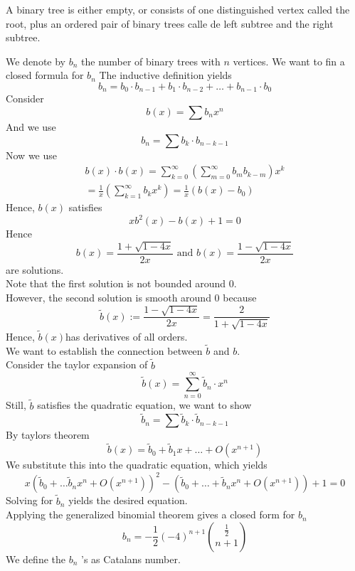 \documentclass[../main.tex]{subfiles}
\begin{document}
\begin{defn}
	A binary tree is either empty, or consists of one distinguished vertex called the root, plus an ordered pair of binary trees calle de left subtree and the right subtree.
\end{defn}
We denote by $b_n$ the number of binary trees with $n$ vertices. We want to fin a closed formula for $b_n$
The inductive definition yields
\[ 
b_n = b_0 \cdot b_{n-1}  + b_1 \cdot b_{n-2}  + \ldots + b_{n-1}  \cdot b_0
\]
Consider
\[ 
	b( x)  = \sum b_n x^{n}
\]
And we use
\[ 
 b_n = \sum b_k \cdot b_{n-k-1} 
\]
Now we use
\begin{align*}
b( x) \cdot b( x)  = \sum_{k=0}^{ \infty } \left( \sum_{m=0}^{ \infty }b_m b_{k-m}  \right) x^{k}\\
= \frac{1}{x} \left( \sum_{k=1}^{ \infty } b_k x^{k}\right)  = \frac{1}{x}(  b( x) -b_0) 
\end{align*}
Hence, $b( x) $ satisfies
\[ 
	x b^{2}( x) -b( x) +1=0
\]
Hence
\[ 
	b( x)  = \frac{1+ \sqrt{1-4x} }{2x} \text{ and } b( x) = \frac{1- \sqrt{1-4x} }{2x}
\]
are solutions.\\
Note that the first solution is not bounded around 0.\\
However, the second solution is smooth around 0 because
\[ 
\tilde b ( x) := \frac{1- \sqrt{1-4x} }{2x} = \frac{2}{1+ \sqrt{1-4x} }
\]
Hence, $\tilde b ( x) $has derivatives of all orders.\\
We want to establish the connection between $\tilde b $ and $b$.\\
Consider the taylor expansion of $\tilde b $
\[ 
	\tilde b ( x) = \sum_{n=0}^{ \infty }\tilde b_n \cdot x^{n}
\]
Still, $\tilde b$ satisfies the quadratic equation, we want to show 
\[ 
 \tilde b _n = \sum \tilde b_k \cdot \tilde b_{n-k-1} 
\]
By taylors theorem
\[ 
	\tilde b ( x) = \tilde b_0 + \tilde b_1 x + \ldots + O( x^{n+1}) 
\]
We substitute this into the quadratic equation, which yields
\[ 
	x (  \tilde b_0 + \ldots \tilde b_n x^{n}+ O( x^{n+1}) )^{2} - (  \tilde b_0 + \ldots + \tilde b_n x^{n} + O( x^{n+1}) ) +1 = 0
\]
Solving for $\tilde b_n$ yields the desired equation.\\
Applying the generalized binomial theorem gives a closed form for $b_n$
\[ 
	b_n = - \frac{1}{2} ( -4)^{n+1}  \binom {  \frac{1}{2}} {  n+1} 
\]
We define the $b_n$ 's as Catalans number.
\end{document}
